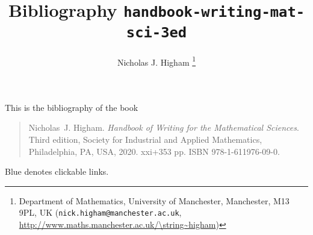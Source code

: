 \documentclass[12pt]{article}
\title{Bibliography \texttt{handbook-writing-mat-sci-3ed}}
\author{Nicholas J. Higham%
        \thanks{%
                Department of Mathematics,
                University of Manchester,
                Manchester, M13 9PL, UK 
                (\texttt{nick.higham@manchester.ac.uk},
                \url{http://www.maths.manchester.ac.uk/\string~higham})
               }
}
\begin{document}
\maketitle
This is the bibliography of the book
\begin{quote}
Nicholas~J. Higham.
{\em Handbook of Writing for the Mathematical Sciences}.
Third edition, Society for Industrial and Applied Mathematics,
  Philadelphia, PA, USA, 2020.
xxi+353 pp.
ISBN 978-1-611976-09-0.
\end{quote}
Blue denotes clickable links.

\nocite{*}



\end{document}
